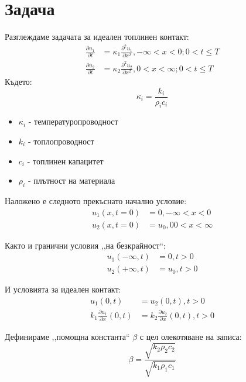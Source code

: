 \setcounter{page}{2}

\section{Задача}
Разглеждаме задачата за идеален топлинен контакт:
\begin{align}
	\frac{\partial u_1}{\partial t} & = \kappa_{1}  \frac{\partial ^ 2 u_1}{\partial x ^ 2}, - \infty < x < 0; 0 < t \leq T \\ 
	\frac{\partial u_2}{\partial t} & = \kappa_{2}  \frac{\partial ^ 2 u_2}{\partial x ^ 2}, 0 < x < \infty; 0 < t \leq T   
\end{align}
Където:
\begin{equation}
	\kappa_{i} = \frac{k_{i}}{\rho_{i} c_{i}}
\end{equation}

\begin{itemize}
	\item $\kappa_{i}$ - температуропроводност
	\item $k_{i}$ - топлопроводност
	\item $c_{i}$ - топлинен капацитет
	\item $\rho_{i}$  - плътност на материала
\end{itemize}

Наложено е следното прекъснато начално условие:
\begin{align}
	u_{1}(x, t = 0) & = 0, -\infty < x < 0  \\
	u_{2}(x, t = 0) & = u_0, 0 0 < x < \infty 
\end{align}

Както и гранични условия ,,на безкрайност``:
\begin{align}
	u_{1}(-\infty, t) & = 0, t > 0   \\
	u_{2}(+\infty, t) & = u_0, t > 0 
\end{align}
 
И условията за идеален контакт:
\begin{align}
	u_{1}(0, t)                                 & = u_2(0, t),  t > 0                                  \\
	k_{1}\frac{\partial u_1}{\partial x} (0, t) & = k_{2}\frac{\partial u_2}{\partial x} (0, t), t > 0 
\end{align}

Дефинираме ,,помощна константа`` $\beta$ с цел олекотяване на записа:
\begin{equation*}
	\beta = \frac{\sqrt{k_2 \rho_2 c_2}}{\sqrt{k_1 \rho_1 c_1}}
\end{equation*}

